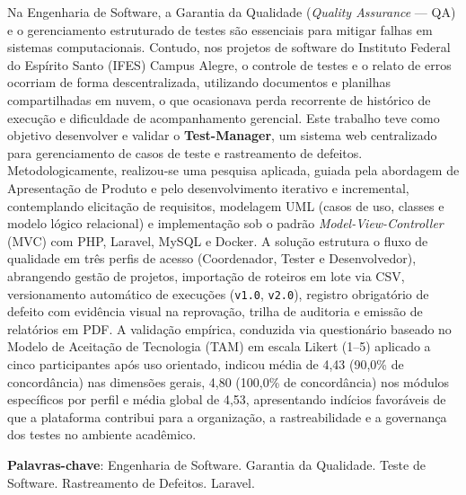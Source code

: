 \begin{resumo}
Na Engenharia de Software, a Garantia da Qualidade (\textit{Quality Assurance} --- QA) e o gerenciamento estruturado de testes são essenciais para mitigar falhas em sistemas computacionais. Contudo, nos projetos de software do Instituto Federal do Espírito Santo (IFES) Campus Alegre, o controle de testes e o relato de erros ocorriam de forma descentralizada, utilizando documentos e planilhas compartilhadas em nuvem, o que ocasionava perda recorrente de histórico de execução e dificuldade de acompanhamento gerencial. Este trabalho teve como objetivo desenvolver e validar o \textbf{Test-Manager}, um sistema web centralizado para gerenciamento de casos de teste e rastreamento de defeitos. Metodologicamente, realizou-se uma pesquisa aplicada, guiada pela abordagem de Apresentação de Produto e pelo desenvolvimento iterativo e incremental, contemplando elicitação de requisitos, modelagem UML (casos de uso, classes e modelo lógico relacional) e implementação sob o padrão \textit{Model-View-Controller} (MVC) com PHP, Laravel, MySQL e Docker. A solução estrutura o fluxo de qualidade em três perfis de acesso (Coordenador, Tester e Desenvolvedor), abrangendo gestão de projetos, importação de roteiros em lote via CSV, versionamento automático de execuções (\texttt{v1.0}, \texttt{v2.0}), registro obrigatório de defeito com evidência visual na reprovação, trilha de auditoria e emissão de relatórios em PDF. A validação empírica, conduzida via questionário baseado no Modelo de Aceitação de Tecnologia (TAM) em escala Likert (1--5) aplicado a cinco participantes após uso orientado, indicou média de 4,43 (90,0\% de concordância) nas dimensões gerais, 4,80 (100,0\% de concordância) nos módulos específicos por perfil e média global de 4,53, apresentando indícios favoráveis de que a plataforma contribui para a organização, a rastreabilidade e a governança dos testes no ambiente acadêmico.

\textbf{Palavras-chave}: Engenharia de Software. Garantia da Qualidade. Teste de Software. Rastreamento de Defeitos. Laravel.
\end{resumo}

